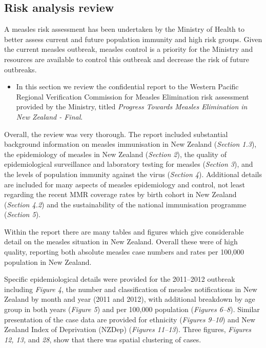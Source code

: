 \documentclass{article}
\begin{document}
\begin{itemize}
\section{Risk analysis review}

A measles risk assessment has been undertaken by the Ministry of Health to better assess current and future population immunity and high risk groups. Given the current measles outbreak, measles control is a priority for the Ministry and resources are available to control this outbreak and decrease the risk of future outbreaks.
\begin{itemize}
\item In this section we review the confidential report to the Western Pacific Regional Verification Commission for Measles Elimination risk assessment provided by the Ministry, titled \emph {Progress Towards Measles Elimination in New Zealand - Final}.
\end{itemize}

Overall, the review was very thorough. The report included substantial background information on measles immunisation in New Zealand (\emph{Section 1.3}), the epidemiology of measles in New Zealand (\emph{Section 2}), the quality of epidemiological surveillance and laboratory testing for measles (\emph{Section 3}), and the levels of population immunity against the virus (\emph{Section 4}). Additional details are included for many aspects of measles epidemiology and control, not least regarding the recent MMR coverage rates by birth cohort in New Zealand (\emph{Section 4.2}) and the sustainability of the national immunisation programme (\emph{Section 5}).

Within the report there are many tables and figures which give considerable detail on the measles situation in New Zealand. Overall these were of high quality, reporting both absolute measles case numbers and rates per 100,000 population in New Zealand.

Specific epidemiological details were provided for the 2011--2012 outbreak including \emph{Figure 4}, the number and classification of measles notifications in New Zealand by month and year (2011 and 2012), with additional breakdown by age group in both years (\emph{Figure 5}) and per 100,000 population (\emph{Figures 6--8}). Similar presentation of the case data are provided for ethnicity (\emph{Figures 9--10}) and New Zealand Index of Deprivation (NZDep) (\emph{Figures 11--13}). Three figures, \emph{Figures 12, 13,} and \emph{28}, show that there was spatial clustering of cases.


\end{itemize}
\end{document}

